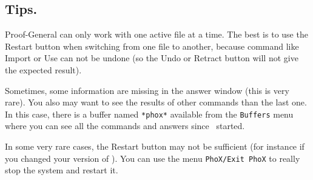 \subsection{Tips.}

Proof-General can only work with one active file at a time. The best
is to use the Restart button when switching from one file to another,
because command like Import or Use can not be undone (so the Undo
or Retract button will not give the expected result).

Sometimes, some information are missing in the answer window (this is
very rare). You also may want to see the results of other commands than
the last one. In this case, there is a buffer named \verb#*phox*#
available from the \verb#Buffers# menu where you can see all the
commands and answers since \AFD\ started.

In some very rare cases, the Restart button may not be sufficient (for
instance if you changed your version of \AFD). You
can use the menu \verb#PhoX/Exit PhoX# to really stop the system and
restart it.
